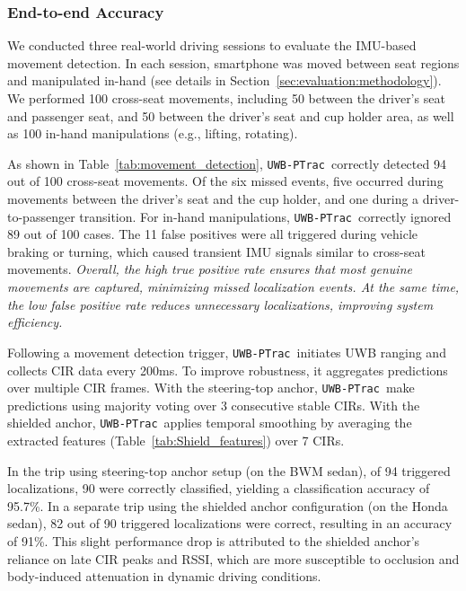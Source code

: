 \documentclass[sigconf]{acmart}
\newcommand{\edited}[1]{#1}
\newcommand{\name}{{{\tt UWB-PTrac}}}
\begin{document}
\subsubsection{End-to-end Accuracy}
%
We conducted three real-world driving sessions to evaluate the IMU-based movement detection.
In each session, smartphone was moved between seat regions and manipulated in-hand (see details in Section~\ref{sec:evaluation:methodology}). We performed 100 cross-seat movements, including 50 between the driver’s seat and passenger seat, and 50 between the driver’s seat and cup holder area, as well as 100 in-hand manipulations (e.g., lifting, rotating).

As shown in Table~\ref{tab:movement_detection}, \name\ correctly detected 94 out of 100 cross-seat movements. Of the six missed events, five occurred during movements between the driver’s seat and the cup holder, and one during a driver-to-passenger transition.
%
For in-hand manipulations, \name\ correctly ignored 89 out of 100 cases. The 11 false positives were all triggered during vehicle braking or turning, which caused transient IMU signals similar to cross-seat movements.
%
\emph{Overall, the high true positive rate ensures that most genuine movements are captured, minimizing missed localization events. At the same time, the low false positive rate reduces unnecessary localizations, improving system efficiency.}




Following a movement detection trigger, \name\ initiates UWB ranging and collects CIR data every 200ms. To improve robustness, it aggregates predictions over multiple CIR frames. With the steering-top anchor, \name\ make predictions using majority voting over 3 consecutive stable CIRs. With the shielded anchor, \name\ applies temporal smoothing by averaging the extracted features (Table~\ref{tab:Shield_features}) over 7 CIRs.


In the trip using steering-top
anchor setup \edited{(on the BWM sedan)}, of 94 triggered 
localizations, 90 were correctly classified, yielding a classification accuracy of 95.7\%. 
%
In a separate trip using the shielded anchor configuration \edited{(on the Honda sedan)}, 82 out of 90 triggered localizations were correct, resulting in an accuracy of 91\%. This slight performance drop is attributed to the shielded anchor’s reliance on late CIR peaks and RSSI, which are more susceptible to occlusion and body-induced attenuation in dynamic driving conditions.
\end{document}
